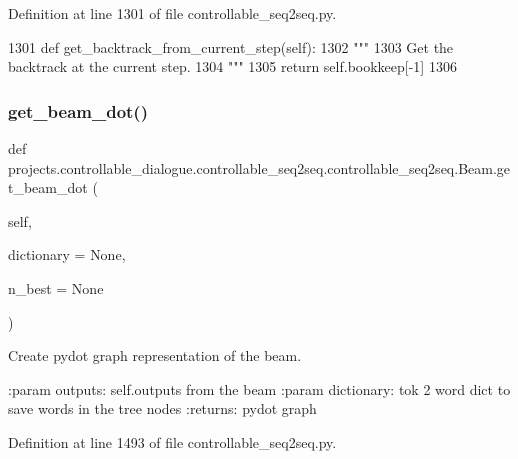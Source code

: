 Definition at line 1301 of file controllable\+\_\+seq2seq.\+py.


\begin{DoxyCode}
1301     \textcolor{keyword}{def }get\_backtrack\_from\_current\_step(self):
1302         \textcolor{stringliteral}{"""}
1303 \textcolor{stringliteral}{        Get the backtrack at the current step.}
1304 \textcolor{stringliteral}{        """}
1305         \textcolor{keywordflow}{return} self.bookkeep[-1]
1306 
\end{DoxyCode}
\mbox{\label{classprojects_1_1controllable__dialogue_1_1controllable__seq2seq_1_1controllable__seq2seq_1_1Beam_aba2e2034d56689b4d77be75d024beaef}} 
\subsubsection{\texorpdfstring{get\+\_\+beam\+\_\+dot()}{get\_beam\_dot()}}
{\footnotesize\ttfamily def projects.\+controllable\+\_\+dialogue.\+controllable\+\_\+seq2seq.\+controllable\+\_\+seq2seq.\+Beam.\+get\+\_\+beam\+\_\+dot (\begin{DoxyParamCaption}\item[{}]{self,  }\item[{}]{dictionary = {\ttfamily None},  }\item[{}]{n\+\_\+best = {\ttfamily None} }\end{DoxyParamCaption})}

\begin{DoxyVerb}Create pydot graph representation of the beam.

:param outputs:
    self.outputs from the beam
:param dictionary:
    tok 2 word dict to save words in the tree nodes
:returns:
    pydot graph
\end{DoxyVerb}
 

Definition at line 1493 of file controllable\+\_\+seq2seq.\+py.


